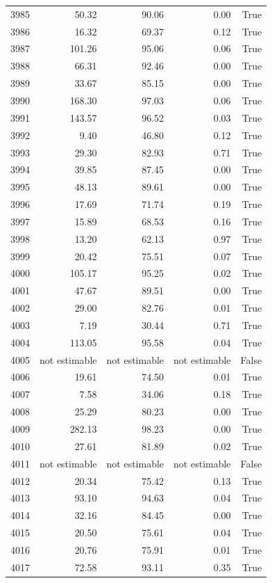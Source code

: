 \begin{longtable}{rrrrr}
3985 & 50.32 & 90.06 & 0.00 & True \\
3986 & 16.32 & 69.37 & 0.12 & True \\
3987 & 101.26 & 95.06 & 0.06 & True \\
3988 & 66.31 & 92.46 & 0.00 & True \\
3989 & 33.67 & 85.15 & 0.00 & True \\
3990 & 168.30 & 97.03 & 0.06 & True \\
3991 & 143.57 & 96.52 & 0.03 & True \\
3992 & 9.40 & 46.80 & 0.12 & True \\
3993 & 29.30 & 82.93 & 0.71 & True \\
3994 & 39.85 & 87.45 & 0.00 & True \\
3995 & 48.13 & 89.61 & 0.00 & True \\
3996 & 17.69 & 71.74 & 0.19 & True \\
3997 & 15.89 & 68.53 & 0.16 & True \\
3998 & 13.20 & 62.13 & 0.97 & True \\
3999 & 20.42 & 75.51 & 0.07 & True \\
4000 & 105.17 & 95.25 & 0.02 & True \\
4001 & 47.67 & 89.51 & 0.00 & True \\
4002 & 29.00 & 82.76 & 0.01 & True \\
4003 & 7.19 & 30.44 & 0.71 & True \\
4004 & 113.05 & 95.58 & 0.04 & True \\
4005 & not estimable & not estimable & not estimable & False \\
4006 & 19.61 & 74.50 & 0.01 & True \\
4007 & 7.58 & 34.06 & 0.18 & True \\
4008 & 25.29 & 80.23 & 0.00 & True \\
4009 & 282.13 & 98.23 & 0.00 & True \\
4010 & 27.61 & 81.89 & 0.02 & True \\
4011 & not estimable & not estimable & not estimable & False \\
4012 & 20.34 & 75.42 & 0.13 & True \\
4013 & 93.10 & 94.63 & 0.04 & True \\
4014 & 32.16 & 84.45 & 0.00 & True \\
4015 & 20.50 & 75.61 & 0.04 & True \\
4016 & 20.76 & 75.91 & 0.01 & True \\
4017 & 72.58 & 93.11 & 0.35 & True \\

\end{longtable}
